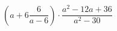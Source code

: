 \begin{ex}[type=expression]
	\begin{condition}
		\(\left( a+6\dfrac{6}{a-6} \right)\cdot\dfrac{a^2-12a+36}{a^2-30}\)
	\end{condition}
\end{ex}